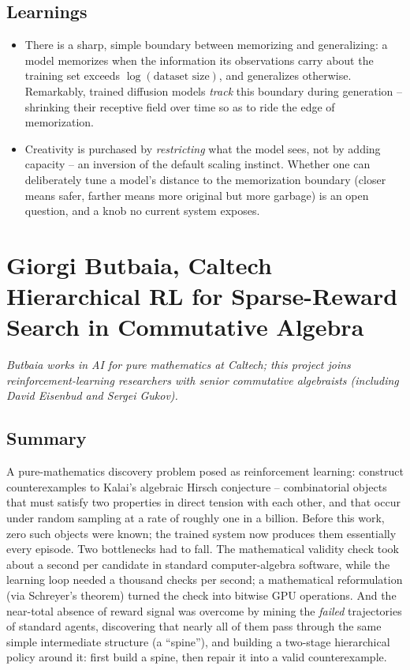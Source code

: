 \documentclass[11pt]{article}
\begin{document}
\subsection*{Learnings}
\begin{itemize}
    \item There is a sharp, simple boundary between memorizing and generalizing: a model memorizes when the information its observations carry about the training set exceeds $\log(\text{dataset size})$, and generalizes otherwise. Remarkably, trained diffusion models \emph{track} this boundary during generation -- shrinking their receptive field over time so as to ride the edge of memorization.
    \item Creativity is purchased by \emph{restricting} what the model sees, not by adding capacity -- an inversion of the default scaling instinct. Whether one can deliberately tune a model's distance to the memorization boundary (closer means safer, farther means more original but more garbage) is an open question, and a knob no current system exposes.
\end{itemize}

\section{Giorgi Butbaia, Caltech\\
{\large Hierarchical RL for Sparse-Reward Search in Commutative Algebra}}

\emph{Butbaia works in AI for pure mathematics at Caltech; this project joins reinforcement-learning researchers with senior commutative algebraists (including David Eisenbud and Sergei Gukov).}

\subsection*{Summary}
A pure-mathematics discovery problem posed as reinforcement learning: construct counterexamples to Kalai's algebraic Hirsch conjecture -- combinatorial objects that must satisfy two properties in direct tension with each other, and that occur under random sampling at a rate of roughly one in a billion. Before this work, zero such objects were known; the trained system now produces them essentially every episode. Two bottlenecks had to fall. The mathematical validity check took about a second per candidate in standard computer-algebra software, while the learning loop needed a thousand checks per second; a mathematical reformulation (via Schreyer's theorem) turned the check into bitwise GPU operations. And the near-total absence of reward signal was overcome by mining the \emph{failed} trajectories of standard agents, discovering that nearly all of them pass through the same simple intermediate structure (a ``spine''), and building a two-stage hierarchical policy around it: first build a spine, then repair it into a valid counterexample.
\end{document}
